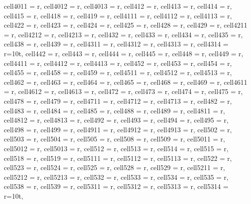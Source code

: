\begin{landscape}
\begin{longtblr}[
  caption = {Changes in average values and effects differences significance from post hoc analysis.},
  label = {tab:appendix_LCBM_all_results_post_hocs}
]
{  cell{40}{11} = {r},
  cell{40}{12} = {r},
  cell{40}{13} = {r},
  cell{41}{2} = {r},
  cell{41}{3} = {r},
  cell{41}{4} = {r},
  cell{41}{5} = {r},
  cell{41}{8} = {r},
  cell{41}{9} = {r},
  cell{41}{11} = {r},
  cell{41}{12} = {r},
  cell{41}{13} = {r},
  cell{42}{2} = {r},
  cell{42}{3} = {r},
  cell{42}{4} = {r},
  cell{42}{5} = {r},
  cell{42}{8} = {r},
  cell{42}{9} = {r},
  cell{42}{11} = {r},
  cell{42}{12} = {r},
  cell{42}{13} = {r},
  cell{43}{2} = {r},
  cell{43}{3} = {r},
  cell{43}{4} = {r},
  cell{43}{5} = {r},
  cell{43}{8} = {r},
  cell{43}{9} = {r},
  cell{43}{11} = {r},
  cell{43}{12} = {r},
  cell{43}{13} = {r},
  cell{43}{14} = {r=10}{t},
  cell{44}{2} = {r},
  cell{44}{3} = {r},
  cell{44}{4} = {r},
  cell{44}{5} = {r},
  cell{44}{8} = {r},
  cell{44}{9} = {r},
  cell{44}{11} = {r},
  cell{44}{12} = {r},
  cell{44}{13} = {r},
  cell{45}{2} = {r},
  cell{45}{3} = {r},
  cell{45}{4} = {r},
  cell{45}{5} = {r},
  cell{45}{8} = {r},
  cell{45}{9} = {r},
  cell{45}{11} = {r},
  cell{45}{12} = {r},
  cell{45}{13} = {r},
  cell{46}{2} = {r},
  cell{46}{3} = {r},
  cell{46}{4} = {r},
  cell{46}{5} = {r},
  cell{46}{8} = {r},
  cell{46}{9} = {r},
  cell{46}{11} = {r},
  cell{46}{12} = {r},
  cell{46}{13} = {r},
  cell{47}{2} = {r},
  cell{47}{3} = {r},
  cell{47}{4} = {r},
  cell{47}{5} = {r},
  cell{47}{8} = {r},
  cell{47}{9} = {r},
  cell{47}{11} = {r},
  cell{47}{12} = {r},
  cell{47}{13} = {r},
  cell{48}{2} = {r},
  cell{48}{3} = {r},
  cell{48}{4} = {r},
  cell{48}{5} = {r},
  cell{48}{8} = {r},
  cell{48}{9} = {r},
  cell{48}{11} = {r},
  cell{48}{12} = {r},
  cell{48}{13} = {r},
  cell{49}{2} = {r},
  cell{49}{3} = {r},
  cell{49}{4} = {r},
  cell{49}{5} = {r},
  cell{49}{8} = {r},
  cell{49}{9} = {r},
  cell{49}{11} = {r},
  cell{49}{12} = {r},
  cell{49}{13} = {r},
  cell{50}{2} = {r},
  cell{50}{3} = {r},
  cell{50}{4} = {r},
  cell{50}{5} = {r},
  cell{50}{8} = {r},
  cell{50}{9} = {r},
  cell{50}{11} = {r},
  cell{50}{12} = {r},
  cell{50}{13} = {r},
  cell{51}{2} = {r},
  cell{51}{3} = {r},
  cell{51}{4} = {r},
  cell{51}{5} = {r},
  cell{51}{8} = {r},
  cell{51}{9} = {r},
  cell{51}{11} = {r},
  cell{51}{12} = {r},
  cell{51}{13} = {r},
  cell{52}{2} = {r},
  cell{52}{3} = {r},
  cell{52}{4} = {r},
  cell{52}{5} = {r},
  cell{52}{8} = {r},
  cell{52}{9} = {r},
  cell{52}{11} = {r},
  cell{52}{12} = {r},
  cell{52}{13} = {r},
  cell{53}{2} = {r},
  cell{53}{3} = {r},
  cell{53}{4} = {r},
  cell{53}{5} = {r},
  cell{53}{8} = {r},
  cell{53}{9} = {r},
  cell{53}{11} = {r},
  cell{53}{12} = {r},
  cell{53}{13} = {r},
  cell{53}{14} = {r=10}{t},
}
\end{longtblr}
\end{landscape}
